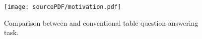 \begin{figure}[ht]
\centering
\texttt{[image: sourcePDF/motivation.pdf]}
\caption{Comparison between \task and conventional table question answering task. }
\vspace{-0.3cm}
\label{fig:motivation}
\vspace{-0.35cm}
\end{figure}